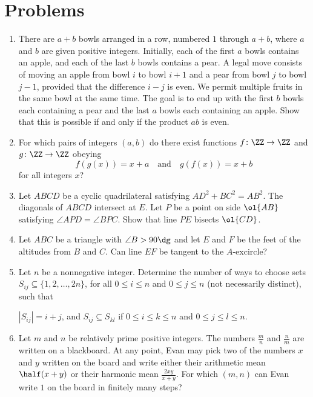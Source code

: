 \documentclass[11pt]{scrartcl}
\begin{document}
\section{Problems}
\begin{enumerate}[\bfseries 1.]
\item %
There are $a+b$ bowls arranged in a row,
numbered $1$ through $a+b$,
where $a$ and $b$ are given positive integers.
Initially, each of the first $a$ bowls contains an apple,
and each of the last $b$ bowls contains a pear.
A legal move consists of moving an apple from bowl $i$ to bowl $i+1$
and a pear from bowl $j$ to bowl $j-1$,
provided that the difference $i-j$ is even.
We permit multiple fruits in the same bowl at the same time.
The goal is to end up with the first $b$ bowls each containing a pear
and the last $a$ bowls each containing an apple.
Show that this is possible if and only if the product $ab$ is even.

\item %
For which pairs of integers $(a, b)$ do there exist functions
$f\colon \ZZ \to \ZZ$ and $g \colon \ZZ \to \ZZ$ obeying
\[ f(g(x)) = x + a \quad \text{and} \quad g(f(x)) = x + b \]
for all integers $x$?

\item %
Let $ABCD$ be a cyclic quadrilateral
satisfying $AD^2 + BC^2 = AB^2$.
The diagonals of $ABCD$ intersect at $E$.
Let $P$ be a point on side $\ol{AB}$
satisfying $\angle APD = \angle BPC$.
Show that line $PE$ bisects $\ol{CD}$.

\item %
Let $ABC$ be a triangle with $\angle B > 90\dg$
and let $E$ and $F$ be the feet of the altitudes from $B$ and $C$.
Can line $EF$ be tangent to the $A$-excircle?

\item %
Let $n$ be a nonnegative integer.
Determine the number of ways to choose sets
$S_{ij} \subseteq \{1, 2, \dots, 2n\}$,
for all $0 \le i \le n$ and $0 \le j \le n$
(not necessarily distinct), such that
\begin{itemize}
  \ii $|S_{ij}| = i+j$, and
  \ii $S_{ij} \subseteq S_{kl}$ if $0 \le i \le k \le n$
  and $0 \le j \le l \le n$.
\end{itemize}

\item %
Let $m$ and $n$ be relatively prime positive integers.
The numbers $\frac mn$ and $\frac nm$ are written on a blackboard.
At any point, Evan may pick two of the numbers $x$ and $y$
written on the board and write either their arithmetic mean $\half(x+y)$
or their harmonic mean $\frac{2xy}{x+y}$.
For which $(m,n)$ can Evan write $1$ on the board in finitely many steps?

\end{enumerate}
\pagebreak
\end{document}
